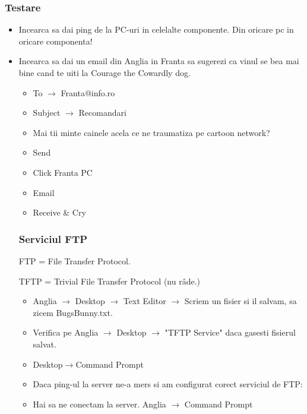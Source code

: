 \documentclass{article}
\begin{document}
\subsubsection{Testare}
\begin{itemize}

    \item[1.] Incearca sa dai ping de la PC-uri in celelalte componente. Din oricare pc in oricare componenta!

    \item[2.] Incearca sa dai un email din Anglia in Franta sa sugerezi ca vinul se bea mai bine cand te uiti la Courage the Cowardly dog.
        \begin{itemize}
            \item  To $\rightarrow$ Franta@info.ro
            \item  Subject $\rightarrow$ Recomandari
            \item  Mai tii minte cainele acela ce ne traumatiza pe cartoon network?
            \item Send
            \item Click Franta PC
            \item Email
            \item Receive \& Cry
        \end{itemize}
\newpage
\subsubsection{Serviciul FTP}
FTP = File Transfer Protocol.

TFTP = Trivial File Transfer Protocol (nu râde.)
\begin{itemize}
    \item[1.] Anglia $\rightarrow$ Desktop $\rightarrow$ Text Editor $\rightarrow$ Scriem un fisier si il salvam, sa zicem BugsBunny.txt.
    \item[2.] Verifica pe Anglia $\rightarrow$ Desktop $\rightarrow$ "TFTP Service" daca gasesti fisierul salvat.
    \item[3.] Desktop$\rightarrow$Command Prompt
    \item[4.] Daca ping-ul la server ne-a mers si am configurat corect serviciul de FTP:
    \item[5.]Hai sa ne conectam la server. Anglia $\rightarrow$ Command Prompt


\end{itemize}
\end{itemize}
\end{document}
